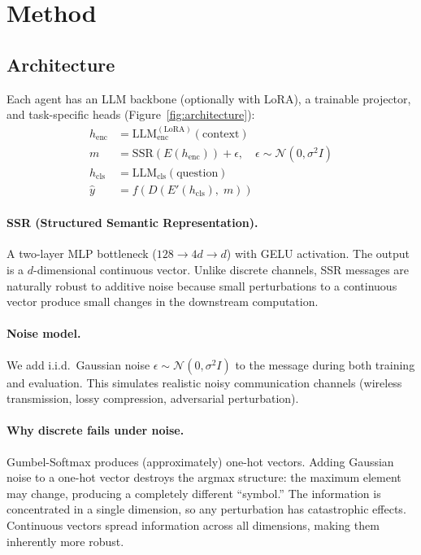 \documentclass[11pt,a4paper]{article}
\begin{document}
\section{Method}

\subsection{Architecture}

Each agent has an LLM backbone (optionally with LoRA), a trainable projector, and task-specific heads (Figure~\ref{fig:architecture}):
\begin{align}
    h_{\mathrm{enc}} &= \mathrm{LLM}_{\mathrm{enc}}^{(\mathrm{LoRA})}(\text{context}) \\
    m &= \mathrm{SSR}(E(h_{\mathrm{enc}})) + \epsilon, \quad \epsilon \sim \mathcal{N}(0, \sigma^2 I) \\
    h_{\mathrm{cls}} &= \mathrm{LLM}_{\mathrm{cls}}(\text{question}) \\
    \hat{y} &= f(D(E'(h_{\mathrm{cls}}),\; m))
\end{align}

\paragraph{SSR (Structured Semantic Representation).}
A two-layer MLP bottleneck ($128 \to 4d \to d$) with GELU activation. The output is a $d$-dimensional continuous vector. Unlike discrete channels, SSR messages are naturally robust to additive noise because small perturbations to a continuous vector produce small changes in the downstream computation.

\paragraph{Noise model.}
We add i.i.d.\ Gaussian noise $\epsilon \sim \mathcal{N}(0, \sigma^2 I)$ to the message during both training and evaluation. This simulates realistic noisy communication channels (wireless transmission, lossy compression, adversarial perturbation).

\paragraph{Why discrete fails under noise.}
Gumbel-Softmax produces (approximately) one-hot vectors. Adding Gaussian noise to a one-hot vector destroys the argmax structure: the maximum element may change, producing a completely different ``symbol.'' The information is concentrated in a single dimension, so any perturbation has catastrophic effects. Continuous vectors spread information across all dimensions, making them inherently more robust.
\end{document}
